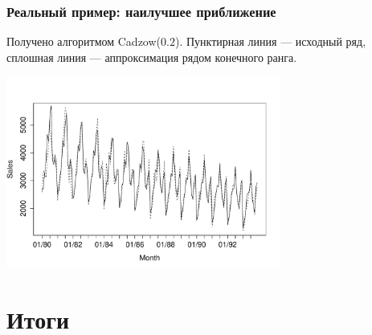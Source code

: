 \documentclass[unicode, notheorems]{beamer}
\begin{document}
\begin{frame}
	\frametitle{Реальный пример: наилучшее приближение}
	Получено алгоритмом Cadzow($0.2$). Пунктирная линия --- исходный ряд, сплошная линия --- аппроксимация рядом конечного ранга.
	\vspace{-0.2cm}
	\begin{center}
		\includegraphics*[width = 9cm]{rlimage.pdf}
	\end{center}
\end{frame}


\section{Итоги}

%  
\end{document}
